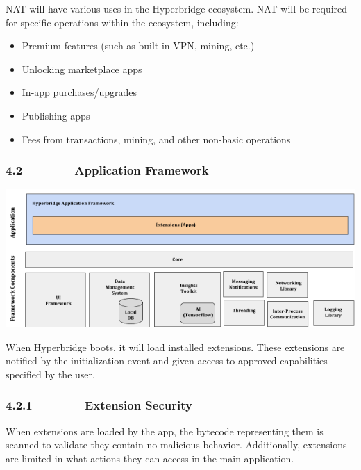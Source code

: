 \documentclass[]{article}
\providecommand{\tightlist}{%
  \setlength{\itemsep}{0pt}\setlength{\parskip}{0pt}}
\begin{document}
{}

{NAT will have various uses in the Hyperbridge ecosystem. NAT will be
required for specific operations within the ecosystem, including:}

\begin{itemize}
\tightlist
\item
  {Premium features (such as built-in VPN, mining, etc.)}
\item
  {Unlocking marketplace apps}
\item
  {In-app purchases/upgrades}
\item
  {Publishing apps}
\item
  {Fees from transactions, mining, and other non-basic operations}
\end{itemize}

{}

\hypertarget{h.f027vztofm4i}{%
\subsubsection{\texorpdfstring{{4.2~~~~~~~~Application
Framework}}{4.2~~~~~~~~Application Framework}}\label{h.f027vztofm4i}}

{\includegraphics{images/image2.png}}

{}

{When Hyperbridge boots, it will load installed extensions. These
extensions are notified by the initialization event and given access to
approved capabilities specified by the user.}

\hypertarget{h.di1w8p4vjbj0}{%
\subsubsection{\texorpdfstring{{4.2.1~~~~~~~~Extension
Security}}{4.2.1~~~~~~~~Extension Security}}\label{h.di1w8p4vjbj0}}

{When extensions are loaded by the app, the bytecode representing them
is scanned to validate they contain no malicious behavior. Additionally,
extensions are limited in what actions they can access in the main
application.}
\end{document}

